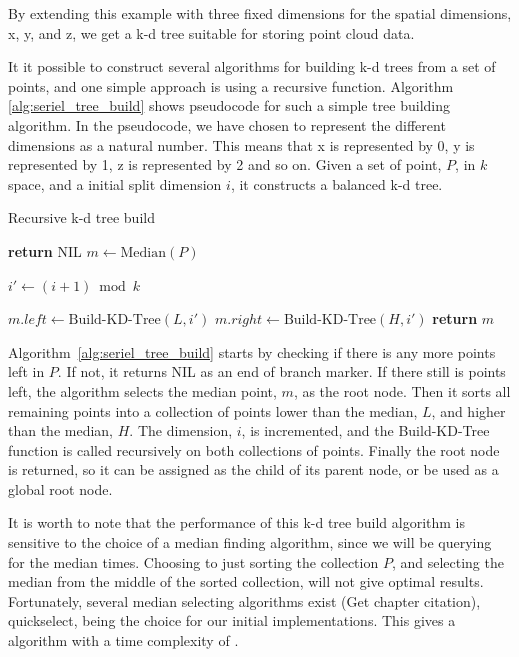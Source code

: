 By extending this example with three fixed dimensions for the spatial dimensions, x, y, and z, we get a k-d tree suitable for storing point cloud data.

It it possible to construct several algorithms for building k-d trees from a set of points, and one simple approach is using a recursive function. Algorithm \ref{alg:seriel_tree_build} shows pseudocode for such a simple tree building algorithm. In the pseudocode, we have chosen to represent the different dimensions as a natural number. This means that x is represented by 0, y is represented by 1, z is represented by 2 and so on. Given a set of point, $P$, in $k$ space, and a initial split dimension $i$, it constructs a balanced k-d tree.

\begin{algorithm}
\caption{Recursive k-d tree build}
\label{alg:seriel_tree_build}
\begin{algorithmic}
         
            \State \textbf{return} NIL
        \Else
            \State $m \gets \text{Median}(P)$

            \State {}
            \State {}

            \State $i' \gets (i + 1) \bmod k$ 

            \State $m.left \gets \text{Build-KD-Tree}(L, i')$
            \State $m.right \gets \text{Build-KD-Tree}(H, i')$
        \EndIf
        \State \textbf{return} $m$
    \EndFunction
\end{algorithmic}
\end{algorithm}

Algorithm~\ref{alg:seriel_tree_build} starts by checking if there is any more points left in $P$. If not, it returns NIL as an end of branch marker. If there still is points left, the algorithm selects the median point, $m$, as the root node. Then it sorts all remaining points into a collection of points lower than the median, $L$, and higher than the median, $H$. The dimension, $i$, is incremented, and the Build-KD-Tree function is called recursively on both collections of points. Finally the root node is returned, so it can be assigned as the child of its parent node, or be used as a global root node.

It is worth to note that the performance of this k-d tree build algorithm is sensitive to the choice of a median finding algorithm, since we will be querying for the median  times. Choosing to just sorting the collection $P$, and selecting the median from the middle of the sorted collection, will not give optimal results. Fortunately, several  median selecting algorithms exist\cite{Cormen:2001} (Get chapter citation), quickselect, being the choice for our initial implementations. This gives a algorithm with a time complexity of \cite{Friedman:1977}.

